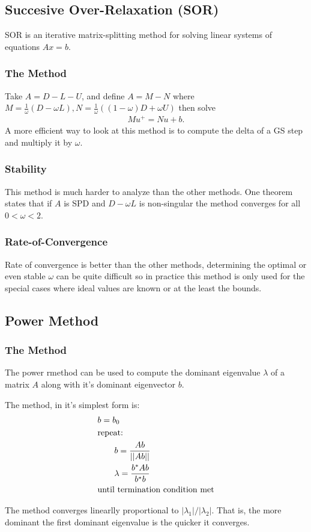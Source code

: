 \subsection{Succesive Over-Relaxation (SOR)}
SOR is an iterative matrix-splitting method for solving linear systems of equations $Ax=b$.
\subsubsection{The Method}
Take $A = D-L-U$, and define $A = M-N$ where $M = \frac{1}{\omega}\left(D-\omega L\right), N = \frac{1}{\omega}\left(\left(1-\omega\right)D+\omega U\right)$ then solve
\begin{align}
  Mu^+ =  Nu + b.
\end{align}
A more efficient way to look at this method is to compute the delta of a GS step and multiply it by $\omega$.
\subsubsection{Stability}
This method is much harder to analyze than the other methods. One theorem states that if $A$ is SPD and $D-\omega L$ is non-singular the method converges for all $0 < \omega < 2$.

\subsubsection{Rate-of-Convergence}
Rate of convergence is better than the other methods, determining the optimal or even stable $\omega$ can be quite difficult so in practice this method is only used
for the special cases where ideal values are known or at the least the bounds.

\subsection{Power Method}
\subsubsection{The Method}
The power rmethod can be used to compute the dominant eigenvalue $\lambda$ of a matrix $A$ along with
it's dominant eigenvector $b$.
\par The method, in it's simplest form is:
\begin{align}
  &b = b_0\\\nonumber
  &\text{repeat:}\\\nonumber
  &\qquad b = \frac{Ab}{||Ab||}\\\nonumber
  &\qquad \lambda = \frac{b^*Ab}{b^*b}\\\nonumber
  &\text{until termination condition met}
\end{align}
\par The method converges linearlly proportional to $|\lambda_1|/|\lambda_2|$. That is, the more dominant the first dominant eigenvalue is
the quicker it converges.

